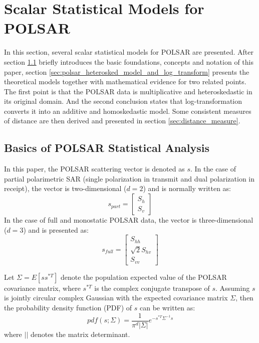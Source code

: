 \documentclass[journal]{IEEEtran}
\begin{document}
\section{Scalar Statistical Models for POLSAR}  
\label{sec:theoretical_model}

In this section, several scalar statistical models for POLSAR are presented.
After section \ref{sec:model_basic} briefly introduces the basic foundations, concepts and notation of this paper, %
  section \ref{sec:polsar_heterosked_model_and_log_transform}
  presents the theoretical models together with mathematical evidence for two related points.
The first point is that the POLSAR data is multiplicative and heteroskedastic in its original domain.
And the second conclusion states that log-transformation converts it into an additive and homoskedastic model.
Some consistent measures of distance are then derived and presented in section \ref{sec:distance_measure}.

\subsection{Basics of POLSAR Statistical Analysis}
\label{sec:model_basic}

In this paper, the POLSAR scattering vector is denoted as $s$.
In the case of partial polarimetric SAR (single polarization in transmit and dual polarization in receipt),
  the vector is two-dimensional ($d=2$) and is normally written as: 
\begin{equation}
s_{part}=\begin{bmatrix}
S_h\\ 
S_v
\end{bmatrix}
\end{equation}
In the case of full and monostatic POLSAR data,
  the vector is three-dimensional ($d=3$) and is presented as:
\begin{equation}
s_{full}=\begin{bmatrix}
S_{hh}\\
\sqrt{2}S_{hv}\\
S_{vv}
\end{bmatrix}
\end{equation}

Let $\Sigma=E [ss^{*T}]$ denote the population expected value of the POLSAR covariance matrix,
  where $s^{*T}$ is the complex conjugate transpose of $s$. 
Assuming %
  $s$ is jointly circular complex Gaussian with the expected covariance matrix $\Sigma$,
  then the probability density function (PDF) of $s$ can be written as:
\begin{equation}
  pdf(s;\Sigma)=\frac{1}{\pi^d|\Sigma|} e^{-s^{*T}\Sigma^{-1}s}
\end{equation}
where $||$ denotes the matrix determinant.
\end{document}
